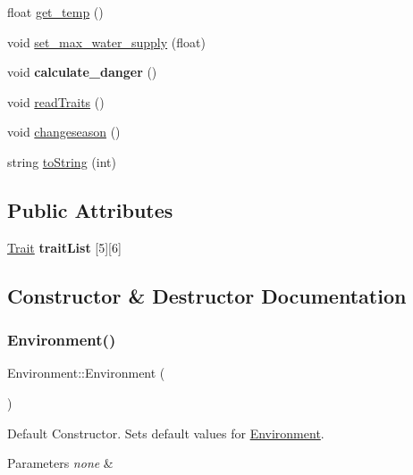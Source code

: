 \begin{DoxyCompactItemize}
float \hyperlink{class_environment_a7d2421a61589319e51acb4692aeacd3a}{get\+\_\+temp} ()
\item 
void \hyperlink{class_environment_a5b9b1df176ffa5a48c672fd6739b4d90}{set\+\_\+max\+\_\+water\+\_\+supply} (float)
\item 
\mbox{\label{class_environment_abec2ecca87c4f9df69969ba322f2c704}} 
void {\bfseries calculate\+\_\+danger} ()
\item 
void \hyperlink{class_environment_a2d4d7e655a5d1fad7e6a74bc9e52d028}{read\+Traits} ()
\item 
void \hyperlink{class_environment_ae12770ca6866e80c6b5c1ed6ce64088c}{changeseason} ()
\item 
string \hyperlink{class_environment_ad8f542ef50c512f13d66ae3cd75071d5}{to\+String} (int)
\end{DoxyCompactItemize}
\subsection*{Public Attributes}
\begin{DoxyCompactItemize}
\item 
\mbox{\label{class_environment_a5f29e1e1537c1005400519d811ca00b3}} 
\hyperlink{class_trait}{Trait} {\bfseries trait\+List} \mbox{[}5\mbox{]}\mbox{[}6\mbox{]}
\end{DoxyCompactItemize}


\subsection{Constructor \& Destructor Documentation}
\mbox{\label{class_environment_a8b427c4448d8b7536666837521b9e83d}} 
\subsubsection{\texorpdfstring{Environment()}{Environment()}\hspace{0.1cm}{\footnotesize\ttfamily [1/2]}}
{\footnotesize\ttfamily Environment\+::\+Environment (\begin{DoxyParamCaption}{ }\end{DoxyParamCaption})}

Default Constructor. Sets default values for \hyperlink{class_environment}{Environment}. 
\begin{DoxyParams}{Parameters}
{\em none} & \\
\hline
\end{DoxyParams}
\mbox{\label{class_environment_a50c8eb3630e6640078ab0939ed54d7a8}} 
